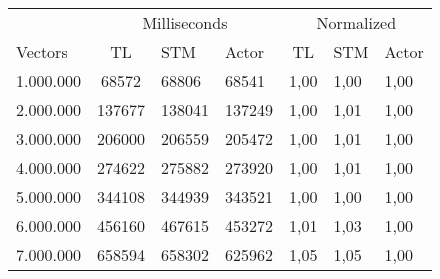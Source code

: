 %
\FloatBarrier
\begin{center}
\begin{table}[h]
\centering
\begin{tabular}{l|cll|cll}
             & \multicolumn{3}{c|}{Milliseconds} & \multicolumn{3}{c}{Normalized} \\
Vectors & TL     & STM     & Actor     & TL      & STM      & Actor     \\ \hline
1.000.000                   &     68572		 &      68806        &    68541	   &	1,00   & 1,00 &    1,00    \\
2.000.000                   &     137677      &      138041      &    137249  &  1,00   & 1,01 &    1,00    \\
3.000.000                   &     206000      &      206559      &    205472  &  1,00   & 1,01 &    1,00    \\
4.000.000                   &     274622      &      275882      &    273920  &  1,00   & 1,01 &    1,00    \\
5.000.000                   &     344108      &      344939      &    343521  &  1,00   & 1,00 &    1,00    \\
6.000.000                   &     456160      &      467615      &    453272  &  1,01   & 1,03 &    1,00    \\
7.000.000                   &     658594      &      658302      &    625962  &  1,05   & 1,05 &    1,00    \\
\end{tabular}
\label{table:test_results_b}
\end{table}
\end{center}

